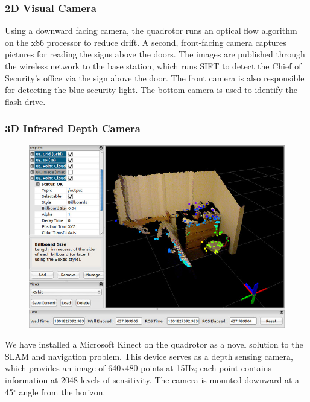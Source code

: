 \documentclass[12pt, letterpaper]{article}
\begin{document}
\subsubsection{2D Visual Camera}

Using a downward facing camera, the quadrotor runs an optical flow algorithm on the x86 processor to reduce drift.  A second, front-facing camera captures pictures for reading the signs above the doors.  The images are published through the wireless network to the base station, which runs SIFT to detect the Chief of Security's office via the sign above the door. The front camera is also responsible for detecting the blue security light.  The bottom camera is used to identify the flash drive.

\subsubsection{3D Infrared Depth Camera}

\begin{figure}[h]
\centering
\includegraphics[width=14cm]{images/point-cloud.jpg}
\label{fig:point-cloud}
\end{figure}

We have installed a Microsoft Kinect on the quadrotor as a novel solution to the SLAM and navigation problem. This device serves as a depth sensing camera, which provides an image of 640x480 points at 15Hz; each point contains information at 2048 levels of sensitivity. The camera is mounted downward at a 45$^\circ$ angle from the horizon.
\end{document}
